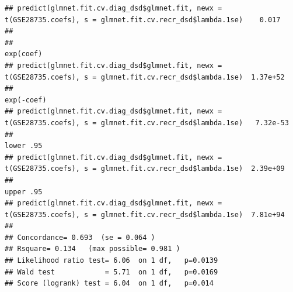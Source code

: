 \documentclass{article}\usepackage[]{graphicx}\usepackage[]{color}
\makeatletter
\newenvironment{kframe}{%
 \def\at@end@of@kframe{}%
 \ifinner\ifhmode%
  \def\at@end@of@kframe{\end{minipage}}%
  \begin{minipage}{\columnwidth}%
 \fi\fi%
 \def\FrameCommand##1{\hskip\@totalleftmargin \hskip-\fboxsep
 \colorbox{shadecolor}{##1}\hskip-\fboxsep
     \hskip-\linewidth \hskip-\@totalleftmargin \hskip\columnwidth}%
 \MakeFramed {\advance\hsize-\width
   \@totalleftmargin\z@ \linewidth\hsize
   \@setminipage}}%
 {\par\unskip\endMakeFramed%
 \at@end@of@kframe}
\newenvironment{knitrout}{}{} %
\makeatother
\begin{document}
\begin{knitrout}
\begin{kframe}
\begin{verbatim}
## predict(glmnet.fit.cv.diag_dsd$glmnet.fit, newx = t(GSE28735.coefs), s = glmnet.fit.cv.recr_dsd$lambda.1se)    0.017
## 
##                                                                                                             exp(coef)
## predict(glmnet.fit.cv.diag_dsd$glmnet.fit, newx = t(GSE28735.coefs), s = glmnet.fit.cv.recr_dsd$lambda.1se)  1.37e+52
##                                                                                                             exp(-coef)
## predict(glmnet.fit.cv.diag_dsd$glmnet.fit, newx = t(GSE28735.coefs), s = glmnet.fit.cv.recr_dsd$lambda.1se)   7.32e-53
##                                                                                                             lower .95
## predict(glmnet.fit.cv.diag_dsd$glmnet.fit, newx = t(GSE28735.coefs), s = glmnet.fit.cv.recr_dsd$lambda.1se)  2.39e+09
##                                                                                                             upper .95
## predict(glmnet.fit.cv.diag_dsd$glmnet.fit, newx = t(GSE28735.coefs), s = glmnet.fit.cv.recr_dsd$lambda.1se)  7.81e+94
## 
## Concordance= 0.693  (se = 0.064 )
## Rsquare= 0.134   (max possible= 0.981 )
## Likelihood ratio test= 6.06  on 1 df,   p=0.0139
## Wald test            = 5.71  on 1 df,   p=0.0169
## Score (logrank) test = 6.04  on 1 df,   p=0.014
\end{verbatim}
\end{kframe}
\end{knitrout}


\end{document}
